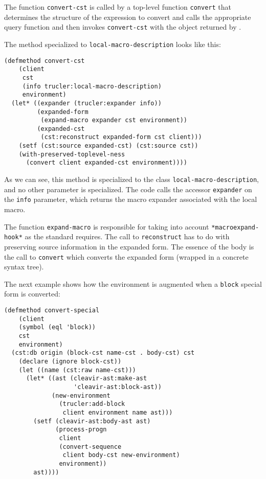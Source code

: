 The function \texttt{convert-cst} is called by a top-level function
\texttt{convert} that determines the structure of the expression to
convert and calls the appropriate \trucler{} query function and then
invokes \texttt{convert-cst} with the object returned by \trucler{}.

The method specialized to \texttt{local-macro-description} looks like
this:

{\small
\begin{verbatim}
(defmethod convert-cst
    (client
     cst
     (info trucler:local-macro-description)
     environment)
  (let* ((expander (trucler:expander info))
         (expanded-form
          (expand-macro expander cst environment))
         (expanded-cst
          (cst:reconstruct expanded-form cst client)))
    (setf (cst:source expanded-cst) (cst:source cst))
    (with-preserved-toplevel-ness
      (convert client expanded-cst environment))))
\end{verbatim}
}

\noindent
As we can see, this method is specialized to the \trucler{} class
\texttt{local-macro-description}, and no other parameter is
specialized.  The code calls the accessor \texttt{expander} on the
\texttt{info} parameter, which returns the macro expander associated
with the local macro.  

The function \texttt{expand-macro} is responsible for taking into
account \texttt{*macroexpand-hook*} as the \commonlisp{} standard
requires.  The call to \texttt{reconstruct} has to do with preserving
source information in the expanded form.  The essence of the body is
the call to \texttt{convert} which converts the expanded form (wrapped
in a concrete syntax tree).

The next example shows how the environment is augmented when a
\texttt{block} special form is converted:

{\small
\begin{verbatim}
(defmethod convert-special
    (client
    (symbol (eql 'block))
    cst
    environment)
  (cst:db origin (block-cst name-cst . body-cst) cst
    (declare (ignore block-cst))
    (let ((name (cst:raw name-cst)))
      (let* ((ast (cleavir-ast:make-ast
                   'cleavir-ast:block-ast))
             (new-environment
               (trucler:add-block
                client environment name ast)))
        (setf (cleavir-ast:body-ast ast)
              (process-progn
               client
               (convert-sequence
                client body-cst new-environment)
               environment))
        ast))))
\end{verbatim}
}

